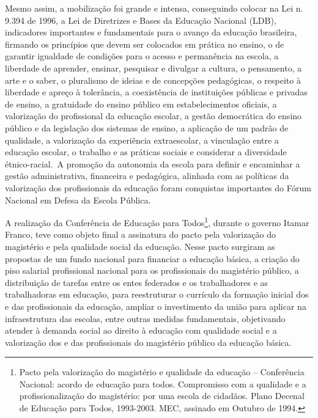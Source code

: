 Mesmo assim, a mobilização foi grande e intensa, conseguindo colocar na
Lei n. 9.394 de 1996, a Lei de Diretrizes e Bases da Educação Nacional
(LDB), indicadores importantes e fundamentais para o avanço da educação
brasileira, firmando os princípios que devem ser colocados em prática no
ensino, o de garantir igualdade de
condições para o acesso e permanência na escola,
a liberdade de aprender, ensinar,
pesquisar e divulgar a cultura, o pensamento, a arte e o saber,
o pluralismo de ideias e de concepções
pedagógicas, o respeito à liberdade e
apreço à tolerância, a coexistência de
instituições públicas e privadas de
ensino, a gratuidade do ensino público
em estabelecimentos oficiais, a
valorização do profissional da educação
escolar, a gestão democrática do
ensino público e da legislação dos sistemas de ensino,
a aplicação de um padrão de qualidade,
a valorização da experiência
extraescolar, a vinculação entre a
educação escolar, o trabalho e as práticas sociais
e considerar a diversidade
étnico-racial.~A promoção da autonomia da escola para definir e
encaminhar a gestão administrativa, financeira e pedagógica, alinhada
com as políticas da valorização dos profissionais da educação foram
conquistas importantes do Fórum Nacional em Defesa da Escola
Pública.

A realização da Conferência de Educação para Todos\footnote{Pacto pela
  valorização do magistério e qualidade da educação -- Conferência
  Nacional: acordo de educação para todos. Compromisso com a qualidade e
  a profissionalização do magistério: por uma escola de cidadãos. Plano
  Decenal de Educação para Todos, 1993-2003. MEC, assinado em Outubro de
  1994.}, durante o governo Itamar Franco, teve como objeto final a
assinatura do pacto pela valorização do magistério e pela qualidade
social da educação. Nesse pacto surgiram as propostas de um fundo
nacional para financiar a educação básica, a criação do piso salarial
profissional nacional para os profissionais do magistério público, a
distribuição de tarefas entre os entes federados e os trabalhadores e as
trabalhadoras em educação, para reestruturar o currículo da formação
inicial dos e das profissionais da educação, ampliar o investimento da
união para aplicar na infraestrutura das escolas, entre outras medidas
fundamentais, objetivando atender à demanda social ao direito à educação
com qualidade social e a valorização dos e das profissionais do
magistério público da educação básica.

